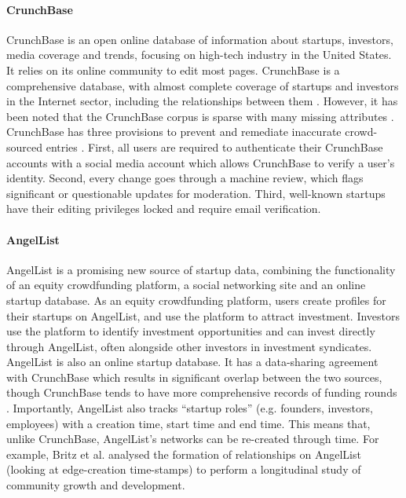 \documentclass[../thesis/thesis.tex]{subfiles}
\begin{document}
\paragraph{CrunchBase}

CrunchBase is an open online database of information about startups, investors, media coverage and trends, focusing on high-tech industry in the United States. It relies on its online community to edit most pages. CrunchBase is a comprehensive database, with almost complete coverage of startups and investors in the Internet sector, including the relationships between them \cite{alexy2012}. However, it has been noted that the CrunchBase corpus is sparse with many missing attributes \cite{ zhao2015}. CrunchBase has three provisions to prevent and remediate inaccurate crowd-sourced entries \cite{crunchbase2014}. First, all users are required to authenticate their CrunchBase accounts with a social media account which allows CrunchBase to verify a user's identity. Second, every change goes through a machine review, which flags significant or questionable updates for moderation. Third, well-known startups have their editing privileges locked and require email verification.

\paragraph{AngelList}

AngelList is a promising new source of startup data, combining the functionality of an equity crowdfunding platform, a social networking site and an online startup database.  As an equity crowdfunding platform, users create profiles for their startups on AngelList, and use the platform to attract investment. Investors use the platform to identify investment opportunities and can invest directly through AngelList, often alongside other investors in investment syndicates. AngelList is also an online startup database. It has a data-sharing agreement with CrunchBase which results in significant overlap between the two sources, though CrunchBase tends to have more comprehensive records of funding rounds \cite{cheng2016}. Importantly, AngelList also tracks ``startup roles'' (e.g. founders, investors, employees) with a creation time, start time and end time. This means that, unlike CrunchBase, AngelList's networks can be re-created through time. For example, Britz et al. \cite{britz2013} analysed the formation of relationships on AngelList (looking at edge-creation time-stamps) to perform a longitudinal study of community growth and development.
\end{document}
